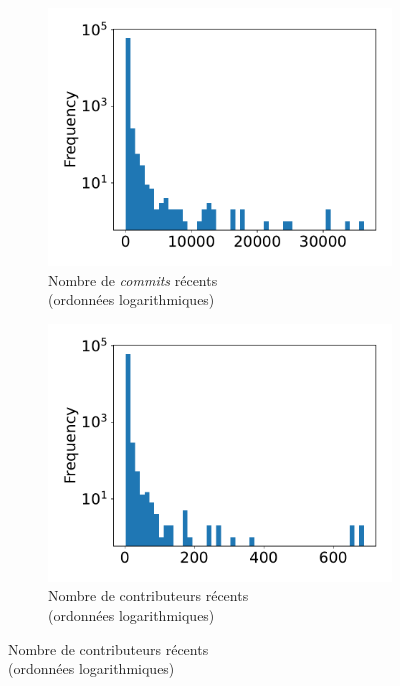 \documentclass[dvipsnames]{llncs}
\begin{document}
    \begin{figure}[ht]
        \begin{subfigure}[t]{0.3\textwidth}
            \includegraphics[width=\textwidth]{../experiment/data_analysis/recentCommitCount_distribution}
            \caption{Nombre de \emph{commits} récents\\(ordonnées logarithmiques)}
        \end{subfigure}
        \begin{subfigure}[t]{0.3\textwidth}
            \includegraphics[width=\textwidth]{../experiment/data_analysis/recentContributorCount_distribution}
            \caption{Nombre de contributeurs récents\\(ordonnées logarithmiques)}

\end{subfigure}
\end{figure}
\end{document}
